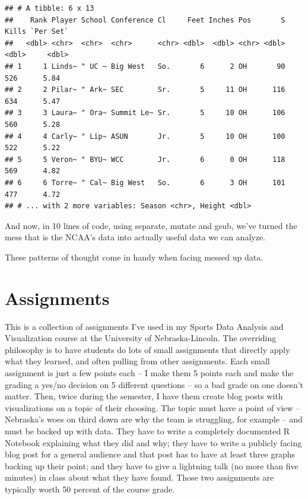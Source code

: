 \documentclass[
]{book}
\begin{document}
\begin{verbatim}
## # A tibble: 6 x 13
##    Rank Player School Conference Cl     Feet Inches Pos       S Kills `Per Set`
##   <dbl> <chr>  <chr>  <chr>      <chr> <dbl>  <dbl> <chr> <dbl> <dbl>     <dbl>
## 1     1 Linds~ " UC ~ Big West   So.       6      2 OH       90   526      5.84
## 2     2 Pilar~ " Ark~ SEC        Sr.       5     11 OH      116   634      5.47
## 3     3 Laura~ " Ora~ Summit Le~ Sr.       5     10 OH      106   560      5.28
## 4     4 Carly~ " Lip~ ASUN       Jr.       5     10 OH      100   522      5.22
## 5     5 Veron~ " BYU~ WCC        Jr.       6      0 OH      118   569      4.82
## 6     6 Torre~ " Cal~ Big West   So.       6      3 OH      101   477      4.72
## # ... with 2 more variables: Season <chr>, Height <dbl>
\end{verbatim}

And now, in 10 lines of code, using separate, mutate and gsub, we've turned the mess that is the NCAA's data into actually useful data we can analyze.

These patterns of thought come in handy when facing messed up data.

\hypertarget{assignments}{%
\chapter{Assignments}\label{assignments}}

This is a collection of assignments I've used in my Sports Data Analysis and Visualization course at the University of Nebraska-Lincoln. The overriding philosophy is to have students do lots of small assignments that directly apply what they learned, and often pulling from other assignments. Each small assignment is just a few points each -- I make them 5 points each and make the grading a yes/no decision on 5 different questions -- so a bad grade on one doesn't matter. Then, twice during the semester, I have them create blog posts with visualizations on a topic of their choosing. The topic must have a point of view -- Nebraska's woes on third down are why the team is struggling, for example -- and must be backed up with data. They have to write a completely documented R Notebook explaining what they did and why; they have to write a publicly facing blog post for a general audience and that post has to have at least three graphs backing up their point; and they have to give a lightning talk (no more than five minutes) in class about what they have found. Those two assignments are typically worth 50 percent of the course grade.
\end{document}
